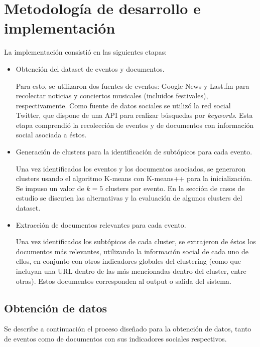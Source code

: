 \section{Metodología de desarrollo e implementación}
\label{sec-4.2}

\label{impl}

   La implementación consistió en las siguientes etapas:

\begin{itemize}
\item Obtención del dataset de eventos y documentos.

     Para esto, se utilizaron dos fuentes de eventos: Google News y
     Last.fm para recolectar noticias y conciertos musicales
     (incluidos festivales), respectivamente. Como fuente de datos
     sociales se utilizó la red social Twitter, que dispone de una API
     para realizar búsquedas por \emph{keywords}. Esta etapa comprendió
     la recolección de eventos y de documentos con información social
     asociada a éstos.
\item Generación de clusters para la identificación de subtópicos para
     cada evento.

     Una vez identificados los eventos y los documentos asociados, se
     generaron clusters usando el algoritmo K-means con K-means++ para
     la inicialización. Se impuso un valor de $k=5$ clusters por
     evento. En la sección de casos de estudio se discuten las
     alternativas y la evaluación de algunos clusters del dataset.
\item Extracción de documentos relevantes para cada evento.

     Una vez identificados los subtópicos de cada cluster, se
     extrajeron de éstos los documentos más relevantes, utilizando la
     información social de cada uno de ellos, en conjunto con otros
     indicadores globales del clustering (como que incluyan una URL
     dentro de las más mencionadas dentro del cluster, entre
     otras). Estos documentos corresponden al output o salida del
     sistema.
\end{itemize}
\subsection{Obtención de datos}
\label{sec-4.2.1}

    Se describe a continuación el proceso diseñado para la obtención de
    datos, tanto de eventos como de documentos con sus indicadores
    sociales respectivos.

